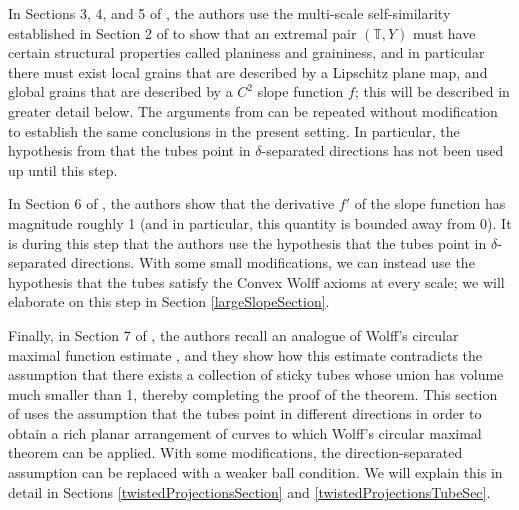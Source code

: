 \documentclass[letterpaper, reqno,11pt]{article}
\numberwithin{equation}{section}
\newcommand{\tubes}{\mathbb{T}}
\numberwithin{thm}{section}
\theoremstyle{remark}
\begin{document}
In Sections 3, 4, and 5 of \cite{WZ}, the authors use the multi-scale self-similarity established in Section 2 of \cite{WZ} to show that an extremal pair $(\tubes,Y)$ must have certain structural properties called planiness and graininess, and in particular there must exist local grains that are described by a Lipschitz plane map, and global grains that are described by a $C^2$ slope function $f$; this will be described in greater detail below. The arguments from \cite{WZ} can be repeated without modification to establish the same conclusions in the present setting. In particular, the hypothesis from \cite{WZ} that the tubes point in $\delta$-separated directions has not been used up until this step. 

In Section 6 of \cite{WZ}, the authors show that the derivative $f'$ of the slope function has magnitude roughly 1 (and in particular, this quantity is bounded away from 0). It is during this step that the authors use the hypothesis that the tubes point in $\delta$-separated directions. With some small modifications, we can instead use the hypothesis that the tubes satisfy the Convex Wolff axioms at every scale; we will elaborate on this step in Section \ref{largeSlopeSection}. 


Finally, in Section 7 of \cite{WZ}, the authors recall an analogue of Wolff's circular maximal function estimate \cite{Wolff97, PYZ}, and they show how this estimate contradicts the assumption that there exists a collection of sticky tubes whose union has volume much smaller than 1, thereby completing the proof of the theorem. This section of \cite{WZ} uses the assumption that the tubes point in different directions in order to obtain a rich planar arrangement of curves to which Wolff's circular maximal theorem can be applied. With some modifications, the direction-separated assumption can be replaced with a weaker ball condition. We will explain this in detail in Sections \ref{twistedProjectionsSection} and \ref{twistedProjectionsTubeSec}.
\end{document}
